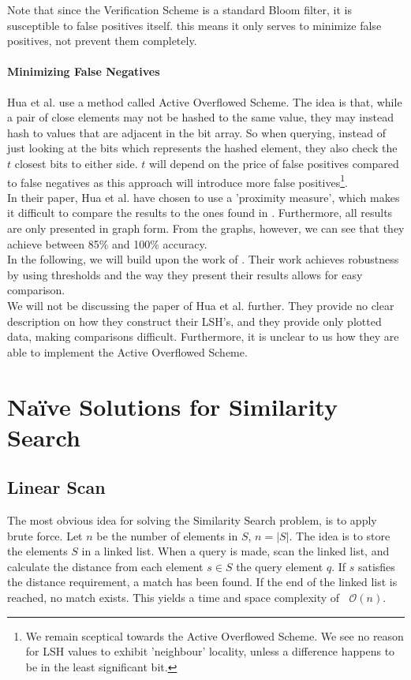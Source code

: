 \documentclass[a4paper,11pt]{article}
\newcommand{\BigO}[1]{\ensuremath{\mathop{}\mathopen{}\mathcal{O}\mathopen{}\left(#1\right)}}
\begin{document}
Note that since the Verification Scheme is a standard Bloom filter, it is susceptible to false positives itself. this means it only serves to minimize false positives, not prevent them completely.

\paragraph{Minimizing False Negatives}
Hua et al. use a method called Active Overflowed Scheme. The idea is that, while a pair of close elements may not be hashed to the same value, they may instead hash to values that are adjacent in the bit array. So when querying, instead of just looking at the bits which represents the hashed element, they also check the $t$ closest bits to either side. $t$ will depend on the price of false positives compared to false negatives as this approach will introduce more false positives\footnote{We remain sceptical towards the Active Overflowed Scheme. We see no reason for LSH values to exhibit 'neighbour' locality, unless a difference happens to be in the least significant bit.
}.\\

In their paper, Hua et al. have chosen to use a 'proximity measure', which makes it difficult to compare the results to the ones found in \cite{paper:harvard}. Furthermore, all results are only presented in graph form. From the graphs, however, we can see that they achieve between 85\% and 100\% accuracy.\\


In the following, we will build upon the work of \cite{paper:harvard}.  Their work achieves robustness by using thresholds and the way they present their results allows for easy comparison.\\

We will not be discussing the paper of Hua et al.\cite{paper:hua} further. They provide no clear description on how they construct their LSH's, and they provide only plotted data, making comparisons difficult. Furthermore, it is unclear to us how they are able to implement the Active Overflowed Scheme.

\section{Naïve Solutions for Similarity Search} \label{naive_approaches}

\subsection{Linear Scan}
The most obvious idea for solving the Similarity Search problem, is to apply brute force.
Let $n$ be the number of elements in $S$, $n = |S|$.
The idea is to store the elements $S$ in a linked list. When a query is made, scan the linked list, and calculate the distance from each element $s \in S$ the query element $q$. If $s$ satisfies the distance requirement, a match has been found. If the end of the linked list is reached, no match exists.
This yields a time and space complexity of \BigO{n}.\\
\end{document}
